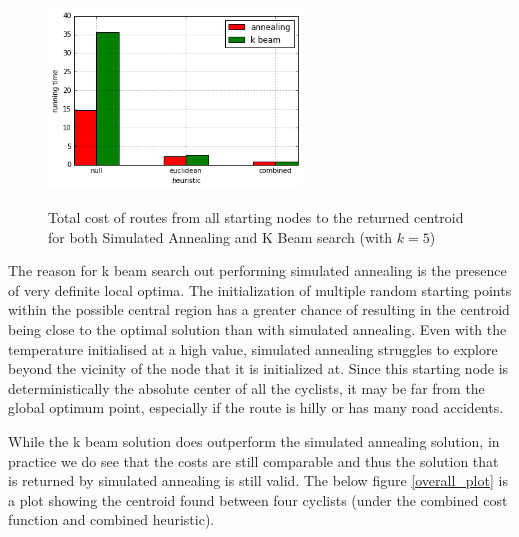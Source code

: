 \documentclass[11pt]{article}
\begin{document}
\begin{figure}[H]
\center
\caption{Total cost of routes from all starting nodes to the returned centroid for both Simulated Annealing and K Beam search (with $k = 5$)}
\includegraphics[width=0.6\textwidth]{../images/k_beam_sim_running_time.png}
\label{sim_ann_and_k_beam_time}
\end{figure}

The reason for k beam search out performing simulated annealing is the presence of very definite local optima. The initialization of multiple random starting points within the possible central region has a greater chance of resulting in the centroid being close to the optimal solution than with simulated annealing. Even with the temperature initialised at a high value, simulated annealing struggles to explore beyond the vicinity of the node that it is initialized at.  Since this starting node is deterministically the absolute center of all the cyclists, it may be far from the global optimum point, especially if the route is hilly or has many road accidents.
\par
While the k beam solution does outperform the simulated annealing solution, in practice we do see that the costs are still comparable and thus the solution that is returned by simulated annealing is still valid. The below figure \ref{overall_plot} is a plot showing the centroid found between four cyclists (under the combined cost function and combined heuristic).
\end{document}
